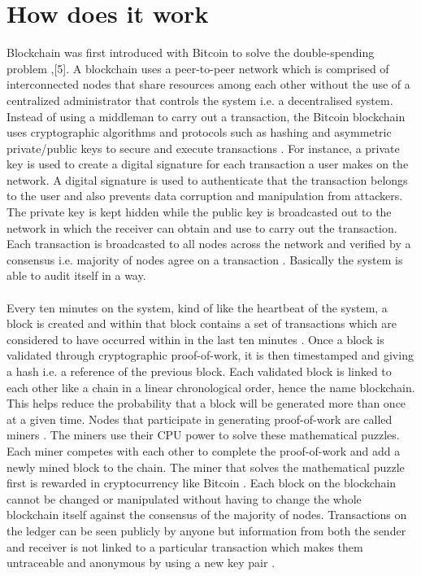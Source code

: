 \documentclass[report]{IEEEtran}
\begin{document}
\section{How does it work}
 Blockchain was first introduced with Bitcoin to solve the double-spending problem \cite{bitcoin},[5]. A blockchain uses a peer-to-peer network which is comprised of interconnected nodes that share resources among each other without the use of a centralized administrator that controls the system i.e. a decentralised system. Instead of using a middleman to carry out a transaction, the Bitcoin blockchain uses cryptographic algorithms and protocols such as hashing and asymmetric private/public keys to secure and execute transactions \cite{bitcoin}. For instance, a private key is used to create a digital signature for each transaction a user makes on the network. A digital signature is used to authenticate that the transaction belongs to the user and also prevents data corruption and manipulation from attackers. The private key is kept hidden while the public key is broadcasted out to the network in which the receiver can obtain and use to carry out the transaction. Each transaction is broadcasted to all nodes across the network and verified by a consensus i.e. majority of nodes agree on a transaction \cite{bitcoin}. Basically the system is able to audit itself in a way.
 \\\\ Every ten minutes on the system, kind of like the heartbeat of the system, a block is created and within that block contains a set of transactions which are considered to have occurred within in the last ten minutes \cite{air}. Once a block is validated through cryptographic proof-of-work, it is then timestamped and giving a hash i.e. a reference of the previous block. Each validated block is linked to each other like a chain in a linear chronological order, hence the name blockchain. This helps reduce the probability that a block will be generated more than once at a given time. Nodes that participate in generating proof-of-work are called miners \cite{bitcoin}. The miners use their CPU power to solve these mathematical puzzles. Each miner competes with each other to complete the proof-of-work and add a newly mined block to the chain. The miner that solves the mathematical puzzle first is rewarded in cryptocurrency like Bitcoin \cite{bitcoin}. Each block on the blockchain cannot be changed or manipulated without having to change the whole blockchain itself against the consensus of the majority of nodes. Transactions on the ledger can be seen publicly by anyone but information from both the sender and receiver is not linked to a particular transaction which makes them untraceable and anonymous by using a new key pair \cite{bitcoin}.
 
\end{document}
